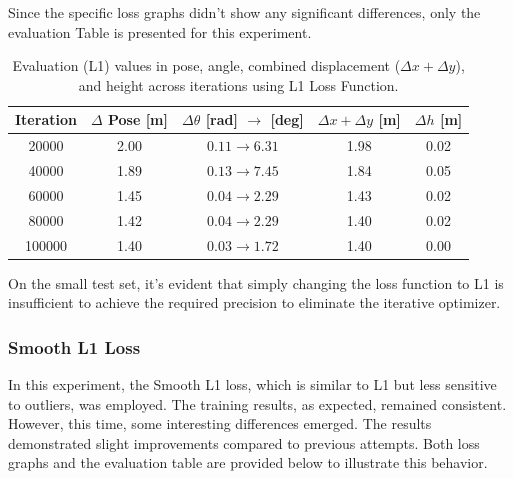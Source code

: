 Since the specific loss graphs didn’t show any significant differences, only the evaluation Table is presented for this experiment.
\begin{table}[H]
    \centering
    \renewcommand{\arraystretch}{1.2} 
    \setlength{\tabcolsep}{10pt} 
    \begin{tabular}{c c c c c}
        \toprule
        \textbf{Iteration} & \textbf{$\Delta$ Pose [m]} & \textbf{$\Delta \theta$ [rad] $\rightarrow$ [deg]} & \textbf{$\Delta x + \Delta y$ [m]} & \textbf{$\Delta h$ [m]} \\
        \midrule
        \num{20000}  & 2.00 & $0.11 \rightarrow 6.31$  & 1.98 & 0.02 \\
        \num{40000}  & 1.89 & $0.13 \rightarrow 7.45$  & 1.84 & 0.05 \\
        \num{60000}  & 1.45 & $0.04 \rightarrow 2.29$  & 1.43 & 0.02 \\
        \num{80000}  & 1.42 & $0.04 \rightarrow 2.29$  & 1.40 & 0.02 \\
        \num{100000} & 1.40 & $0.03 \rightarrow 1.72$  & 1.40 & 0.00 \\
        \bottomrule
    \end{tabular}
    \caption{Evaluation (L1) values in pose, angle, combined displacement ($\Delta x + \Delta y$), and height across iterations using L1 Loss Function.}
    \label{tab:pose_variations_l1}
\end{table}
On the small test set, it’s evident that simply changing the loss function to L1 is insufficient to achieve the required precision to eliminate the iterative optimizer. 

\subsubsection*{Smooth L1 Loss}
In this experiment, the Smooth L1 loss, which is similar to L1 but less sensitive to outliers, was employed. The training results, as expected, remained consistent. However, this time, some interesting differences emerged. The results demonstrated slight improvements compared to previous attempts. Both loss graphs and the evaluation table are provided below to illustrate this behavior.

